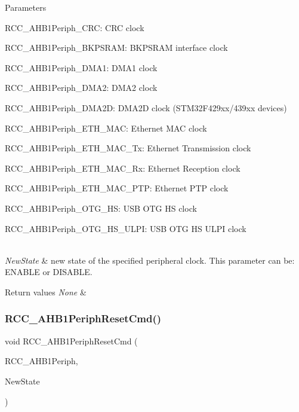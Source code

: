 \begin{DoxyParams}{Parameters}
\begin{DoxyItemize}
 \item R\+C\+C\+\_\+\+A\+H\+B1\+Periph\+\_\+\+C\+RC\+: C\+RC clock \item R\+C\+C\+\_\+\+A\+H\+B1\+Periph\+\_\+\+B\+K\+P\+S\+R\+AM\+: B\+K\+P\+S\+R\+AM interface clock \item R\+C\+C\+\_\+\+A\+H\+B1\+Periph\+\_\+\+D\+M\+A1\+: D\+M\+A1 clock \item R\+C\+C\+\_\+\+A\+H\+B1\+Periph\+\_\+\+D\+M\+A2\+: D\+M\+A2 clock \item R\+C\+C\+\_\+\+A\+H\+B1\+Periph\+\_\+\+D\+M\+A2D\+: D\+M\+A2D clock (S\+T\+M32\+F429xx/439xx devices) \item R\+C\+C\+\_\+\+A\+H\+B1\+Periph\+\_\+\+E\+T\+H\+\_\+\+M\+AC\+: Ethernet M\+AC clock \item R\+C\+C\+\_\+\+A\+H\+B1\+Periph\+\_\+\+E\+T\+H\+\_\+\+M\+A\+C\+\_\+\+Tx\+: Ethernet Transmission clock \item R\+C\+C\+\_\+\+A\+H\+B1\+Periph\+\_\+\+E\+T\+H\+\_\+\+M\+A\+C\+\_\+\+Rx\+: Ethernet Reception clock \item R\+C\+C\+\_\+\+A\+H\+B1\+Periph\+\_\+\+E\+T\+H\+\_\+\+M\+A\+C\+\_\+\+P\+TP\+: Ethernet P\+TP clock \item R\+C\+C\+\_\+\+A\+H\+B1\+Periph\+\_\+\+O\+T\+G\+\_\+\+HS\+: U\+SB O\+TG HS clock \item R\+C\+C\+\_\+\+A\+H\+B1\+Periph\+\_\+\+O\+T\+G\+\_\+\+H\+S\+\_\+\+U\+L\+PI\+: U\+SB O\+TG HS U\+L\+PI clock \end{DoxyItemize}
\\
\hline
{\em New\+State} & new state of the specified peripheral clock. This parameter can be\+: E\+N\+A\+B\+LE or D\+I\+S\+A\+B\+LE. \\
\hline
\end{DoxyParams}

\begin{DoxyRetVals}{Return values}
{\em None} & \\
\hline
\end{DoxyRetVals}
\mbox{\label{group___r_c_c_gaa7c450567f4731d4f0615f63586cad86}} 
\subsubsection{\texorpdfstring{R\+C\+C\+\_\+\+A\+H\+B1\+Periph\+Reset\+Cmd()}{RCC\_AHB1PeriphResetCmd()}}
{\footnotesize\ttfamily void R\+C\+C\+\_\+\+A\+H\+B1\+Periph\+Reset\+Cmd (\begin{DoxyParamCaption}\item[{uint32\+\_\+t}]{R\+C\+C\+\_\+\+A\+H\+B1\+Periph,  }\item[{Functional\+State}]{New\+State }\end{DoxyParamCaption})}




